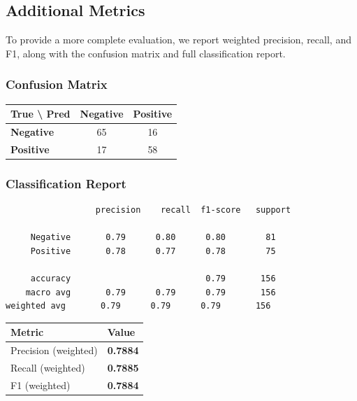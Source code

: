\documentclass[11pt,a4paper]{article}
\begin{document}
\subsection{Additional Metrics}

To provide a more complete evaluation, we report weighted precision, recall, and F1, along with the confusion matrix and full classification report.

\subsubsection{Confusion Matrix}

\begin{center}
\begin{tabular}{lcc}
\toprule
\textbf{True \textbackslash{} Pred} & \textbf{Negative} & \textbf{Positive} \\
\midrule
\textbf{Negative} & 65 & 16 \\
\textbf{Positive} & 17 & 58 \\
\bottomrule
\end{tabular}
\end{center}

\subsubsection{Classification Report}

\begin{lstlisting}
                  precision    recall  f1-score   support

     Negative       0.79      0.80      0.80        81
     Positive       0.78      0.77      0.78        75

     accuracy                           0.79       156
    macro avg       0.79      0.79      0.79       156
weighted avg       0.79      0.79      0.79       156
\end{lstlisting}

\begin{center}
\begin{tabular}{ll}
\toprule
\textbf{Metric} & \textbf{Value} \\
\midrule
Precision (weighted) & \textbf{0.7884} \\
Recall (weighted)    & \textbf{0.7885} \\
F1 (weighted)        & \textbf{0.7884} \\
\bottomrule
\end{tabular}
\end{center}
\end{document}
